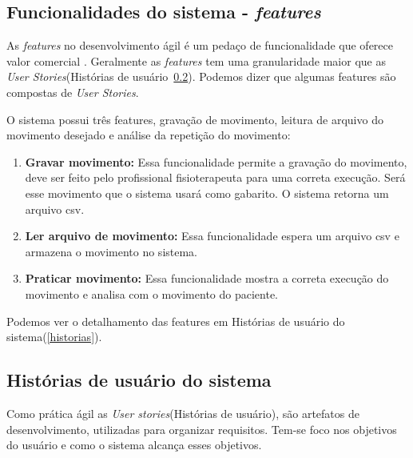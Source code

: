 \subsection{Funcionalidades do sistema - \textit{features}}\label{sub:features}
    As \textit{features} no desenvolvimento ágil é um pedaço de funcionalidade que oferece valor comercial \cite{versionOne}.
  Geralmente as \textit{features} tem uma granularidade maior que as \textit{User Stories}(Histórias de usuário~\ref{sec:Histórias de usuário}).
  Podemos dizer que algumas features são compostas de \textit{User Stories}.

    O sistema possui três features, gravação de movimento, leitura de arquivo do movimento desejado e análise da repetição do movimento:
  \begin{enumerate}
    \item \textbf{Gravar movimento:} Essa funcionalidade permite a gravação do movimento, deve ser feito pelo profissional fisioterapeuta
    para uma correta execução. Será esse movimento que o sistema usará como gabarito. O sistema retorna um arquivo csv.
    \item \textbf{Ler arquivo de movimento:} Essa funcionalidade espera um arquivo csv e armazena o movimento no sistema.
    \item \textbf{Praticar movimento:} Essa funcionalidade mostra a correta execução do movimento e analisa com o movimento do paciente.
  \end{enumerate}

  Podemos ver o detalhamento das features em Histórias de usuário do sistema(\ref{historias}).
\subsection{Histórias de usuário do sistema}
\label{sec:Histórias de usuário}
  Como prática ágil as \textit{User stories}(Histórias de usuário), são artefatos
de desenvolvimento, utilizadas para organizar requisitos. Tem-se foco nos objetivos
do usuário e como o sistema alcança esses objetivos.

